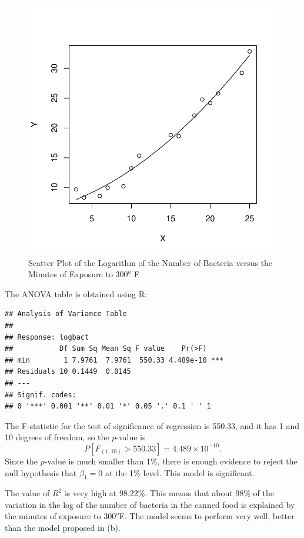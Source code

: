 \begin{solution}{2.22}
\begin{enumerate}
\begin{figure}
\begin{center}
\begin{knitrout}
{\centering \includegraphics[width=.45\linewidth]{figure/fig-unnamed-chunk-38-1}

}



\end{knitrout}
\end{center}
\caption{Scatter Plot of the Logarithm of the Number of Bacteria versus the Minutes of Exposure to $300^{o}$ F}
\label{fig:simple:bact5}
\end{figure}

The ANOVA table is obtained using \textsf{R}:
\begin{knitrout}
\color{fgcolor}\begin{kframe}
\begin{alltt}
\end{alltt}
\begin{verbatim}
## Analysis of Variance Table
##
## Response: logbact
##           Df Sum Sq Mean Sq F value    Pr(>F)
## min        1 7.9761  7.9761  550.33 4.489e-10 ***
## Residuals 10 0.1449  0.0145
## ---
## Signif. codes:
## 0 '***' 0.001 '**' 0.01 '*' 0.05 '.' 0.1 ' ' 1
\end{verbatim}
\end{kframe}
\end{knitrout}

The F-statistic for the test of significance of regression is 550.33, and it has 1 and 10 degrees of freedom, so the $p$-value is $$P[F_{(1,10)}>550.33]= 4.489\times10^{-10}.$$ Since the $p$-value is much smaller than 1\%, there is enough evidence to reject the null hypothesis that $\beta_{1}=0$ at the 1\% level. This model is significant.

The value of $R^{2}$ is very high at $98.22\%$. This means that about 98\% of the variation in the log of the number of bacteria in the canned food is explained by the minutes of exposure to $300^{o}$F. The model seems to perform very well, better than the model proposed in (b).


\end{enumerate}
\end{solution}
